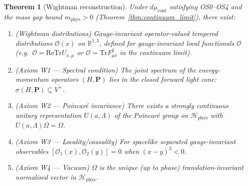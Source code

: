 \documentclass[11pt,a4paper]{amsart}
\newtheorem{theorem}{Theorem}[section]
\theoremstyle{definition}
\newcommand{\R}{\mathbb{R}}
\newcommand{\re}{\mathrm{Re}}
\newcommand{\Tr}{\mathrm{Tr}}
\begin{document}
\begin{theorem}[Wightman reconstruction]
\label{thm:Wightman}
Under $d\mu_{\mathrm{cont}}$ satisfying OS0--OS4 and the mass gap bound
$m_{\mathrm{phys}} > 0$ (Theorem~\ref{thm:continuum_limit}), there exist:
\begin{enumerate}[label=(\roman*)]
\item \emph{(Wightman distributions)} Gauge-invariant operator-valued
      tempered distributions $\mathcal{O}(x)$ on $\R^{1,3}$,
      defined for gauge-invariant local functionals $\mathcal{O}$ (e.g.\
      $\mathcal{O} = \re\Tr U_{x,\mu}$ or $\mathcal{O} = \Tr F_{\mu\nu}^2$
      in the continuum limit).
\item \emph{(Axiom W1 — Spectral condition)} The joint spectrum of the
      energy-momentum operators $(H,\mathbf{P})$ lies in the closed forward
      light cone: $\sigma(H,\mathbf{P}) \subseteq \overline{V^+}$.
\item \emph{(Axiom W2 — Poincaré invariance)} There exists a strongly
      continuous unitary representation $U(a,\Lambda)$ of the Poincaré group
      on $\mathcal{H}_{\mathrm{phys}}$ with $U(a,\Lambda)\Omega = \Omega$.
\item \emph{(Axiom W3 — Locality/causality)} For spacelike separated
      gauge-invariant observables $[\mathcal{O}_1(x),\mathcal{O}_2(y)] = 0$
      when $(x-y)^2 < 0$.
\item \emph{(Axiom W4 — Vacuum)} $\Omega$ is the unique
      (up to phase) translation-invariant normalised vector in
      $\mathcal{H}_{\mathrm{phys}}$.
\end{enumerate}
\end{theorem}
\end{document}
